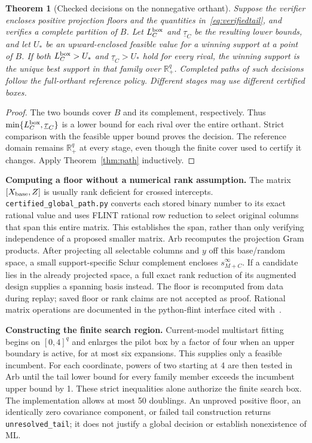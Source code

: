 \documentclass[11pt,a4paper]{article}
\newtheorem{theorem}{Theorem}
\theoremstyle{remark}\newtheorem{remark}[theorem]{Remark}
\newcommand{\R}{\mathbb R}
\begin{document}
\begin{theorem}[Checked decisions on the nonnegative orthant]\label{thm:global}
Suppose the verifier encloses positive projection floors and the quantities
in~\eqref{eq:verifiedtail}, and verifies a complete partition of $B$. Let
$L_C^{\rm box}$ and $\underline\tau_C$ be the resulting lower bounds, and let
$U_*$ be an upward-enclosed feasible value for a winning support at a point of $B$.
If both $L_C^{\rm box}>U_*$ and $\underline\tau_C>U_*$ hold for every rival,
the winning support is the unique best support in that family over $\R_+^q$.
Completed paths of such decisions follow the full-orthant reference policy.
Different stages may use different certified boxes.
\end{theorem}
\begin{proof}
The two bounds cover $B$ and its complement, respectively. Thus
$\min\{L_C^{\rm box},\underline\tau_C\}$ is a lower bound for each rival over
the entire orthant. Strict comparison with the feasible upper bound proves the
decision. The reference domain remains $\R_+^q$ at every stage, even though the
finite cover used to certify it changes. Apply Theorem~\ref{thm:path} inductively.
\end{proof}

\textbf{Computing a floor without a numerical rank assumption.}
The matrix $[X_{\rm base},Z]$ is usually rank deficient for crossed intercepts.
\texttt{certified\_global\_path.py} converts each stored binary number to its
exact rational value and uses FLINT rational row reduction to select original
columns that span this entire matrix. This establishes the span, rather than
only verifying independence of a proposed smaller matrix. Arb recomputes the
projection Gram products. After projecting all selectable columns and $y$ off
this base/random space, a small support-specific Schur complement encloses
$s_{M+C}^{\infty}$. If a candidate lies in the already projected space, a full
exact rank reduction of its augmented design supplies a spanning basis instead.
The floor is recomputed from data during replay; saved floor or rank claims are
not accepted as proof. Rational matrix operations are documented in the
python-flint interface cited with~\cite{arb}.

\textbf{Constructing the finite search region.}
Current-model multistart fitting begins on $[0,4]^q$ and enlarges the pilot box
by a factor of four when an upper boundary is active, for at most six expansions.
This supplies only a feasible incumbent. For each coordinate, powers of two
starting at 4 are then tested in Arb until the tail lower bound for every family
member exceeds the incumbent upper bound by 1. These strict inequalities alone
authorize the finite search box. The implementation allows at most 50 doublings.
An unproved positive floor, an identically zero covariance component, or failed
tail construction returns \texttt{unresolved\_tail}; it does not justify a global
decision or establish nonexistence of ML.
\end{document}
